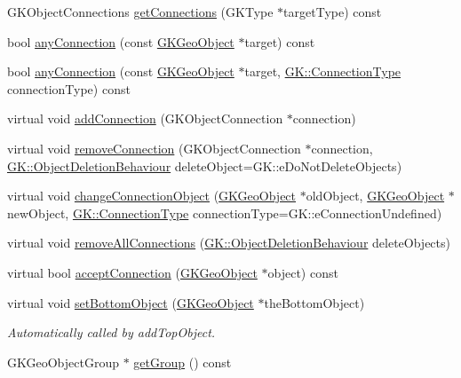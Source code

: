 \begin{DoxyCompactItemize}
\item 
G\+K\+Object\+Connections \hyperlink{classGKGeoObject_ab262093423bac1799e757fd482630fbe}{get\+Connections} (G\+K\+Type $\ast$target\+Type) const 
\item 
bool \hyperlink{classGKGeoObject_a2d8ccad133fd3be2f904e3a39196723e}{any\+Connection} (const \hyperlink{classGKGeoObject}{G\+K\+Geo\+Object} $\ast$target) const 
\item 
bool \hyperlink{classGKGeoObject_a469a8d173bc5b6c64de2cb49018ac1b2}{any\+Connection} (const \hyperlink{classGKGeoObject}{G\+K\+Geo\+Object} $\ast$target, \hyperlink{namespaceGK_acff655917cf02cfbda984b465457ce74}{G\+K\+::\+Connection\+Type} connection\+Type) const 
\item 
virtual void \hyperlink{classGKGeoObject_a9397e33c3e0bc9a437ed88ef1e71a8c3}{add\+Connection} (G\+K\+Object\+Connection $\ast$connection)
\item 
virtual void \hyperlink{classGKGeoObject_a8f09e8f475c307bbb3e0eb5472d148a7}{remove\+Connection} (G\+K\+Object\+Connection $\ast$connection, \hyperlink{namespaceGK_a2f01756bc0253f960ed9e75b00638fd3}{G\+K\+::\+Object\+Deletion\+Behaviour} delete\+Object=G\+K\+::e\+Do\+Not\+Delete\+Objects)
\item 
virtual void \hyperlink{classGKGeoObject_a165b244b3c7e713e87df698144d24fbe}{change\+Connection\+Object} (\hyperlink{classGKGeoObject}{G\+K\+Geo\+Object} $\ast$old\+Object, \hyperlink{classGKGeoObject}{G\+K\+Geo\+Object} $\ast$new\+Object, \hyperlink{namespaceGK_acff655917cf02cfbda984b465457ce74}{G\+K\+::\+Connection\+Type} connection\+Type=G\+K\+::e\+Connection\+Undefined)
\item 
virtual void \hyperlink{classGKGeoObject_a6b78e6d11185fdd58f94b30895bd1993}{remove\+All\+Connections} (\hyperlink{namespaceGK_a2f01756bc0253f960ed9e75b00638fd3}{G\+K\+::\+Object\+Deletion\+Behaviour} delete\+Objects)
\item 
virtual bool \hyperlink{classGKGeoObject_aaf1fb883b5660c91eef09182524336ae}{accept\+Connection} (\hyperlink{classGKGeoObject}{G\+K\+Geo\+Object} $\ast$object) const 
\item 
virtual void \hyperlink{classGKGeoObject_a12ff207590fdaab07595a2fe5c43a6f8}{set\+Bottom\+Object} (\hyperlink{classGKGeoObject}{G\+K\+Geo\+Object} $\ast$the\+Bottom\+Object)\hypertarget{classGKGeoObject_a12ff207590fdaab07595a2fe5c43a6f8}{}\label{classGKGeoObject_a12ff207590fdaab07595a2fe5c43a6f8}

\begin{DoxyCompactList}\small\item\em Automatically called by add\+Top\+Object. \end{DoxyCompactList}\item 
G\+K\+Geo\+Object\+Group $\ast$ \hyperlink{classGKGeoObject_aa36faa1a7f0e7d7ba0b0cc2eeaca835c}{get\+Group} () const \hypertarget{classGKGeoObject_aa36faa1a7f0e7d7ba0b0cc2eeaca835c}{}\label{classGKGeoObject_aa36faa1a7f0e7d7ba0b0cc2eeaca835c}


\end{DoxyCompactItemize}
